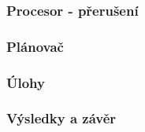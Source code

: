 \documentclass{beamer}
\begin{document}
\begin{frame} %
\frametitle{Procesor - přerušení}

\end{frame}

\begin{frame} %
\frametitle{Plánovač}

\end{frame}

\begin{frame} %
\frametitle{Úlohy}

\end{frame}

\begin{frame} 
\frametitle{Výsledky a závěr}

\end{frame}
\end{document}
